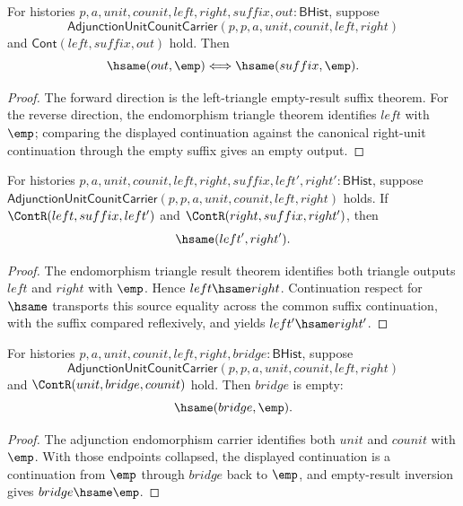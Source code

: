 \begin{theorem}
\label{thm:monad-adjunction-endomorphism-left-triangle-suffix-output-empty-iff}
For histories $p,a,unit,counit,left,right,suffix,out:\mathsf{BHist}$, suppose
$$
\mathsf{AdjunctionUnitCounitCarrier}(p,p,a,unit,counit,left,right)
$$
and $\mathsf{Cont}(left,suffix,out)$ hold. Then
$$
\hsame(out,\emp)\Longleftrightarrow\hsame(suffix,\emp).
$$
\end{theorem}
\begin{proof}
The forward direction is the left-triangle empty-result suffix theorem. For
the reverse direction, the endomorphism triangle theorem identifies $left$ with
$\emp$; comparing the displayed continuation against the canonical right-unit
continuation through the empty suffix gives an empty output.
\end{proof}

\begin{theorem}
\label{thm:monad-adjunction-endomorphism-parallel-triangle-suffix-same}
For histories $p,a,unit,counit,left,right,suffix,left',right':\mathsf{BHist}$,
suppose
$\mathsf{AdjunctionUnitCounitCarrier}(p,p,a,unit,counit,left,right)$ holds.
If $\ContR(left,suffix,left')$ and $\ContR(right,suffix,right')$, then
$$
\hsame(left',right').
$$
\end{theorem}
\begin{proof}
The endomorphism triangle result theorem identifies both triangle outputs
$left$ and $right$ with $\emp$. Hence $left\hsame right$. Continuation
respect for $\hsame$ transports this source equality across the common
suffix continuation, with the suffix compared reflexively, and yields
$left'\hsame right'$.
\end{proof}

\begin{theorem}
\label{thm:monad-adjunction-endomorphism-middle-between-unit-counit-empty}
For histories $p,a,unit,counit,left,right,bridge:\mathsf{BHist}$, suppose
$$
\mathsf{AdjunctionUnitCounitCarrier}(p,p,a,unit,counit,left,right)
$$
and $\ContR(unit,bridge,counit)$ hold. Then $bridge$ is empty:
$$
\hsame(bridge,\emp).
$$
\end{theorem}
\begin{proof}
The adjunction endomorphism carrier identifies both $unit$ and $counit$ with
$\emp$. With those endpoints collapsed, the displayed continuation is a
continuation from $\emp$ through $bridge$ back to $\emp$, and empty-result
inversion gives $bridge\hsame\emp$.
\end{proof}

